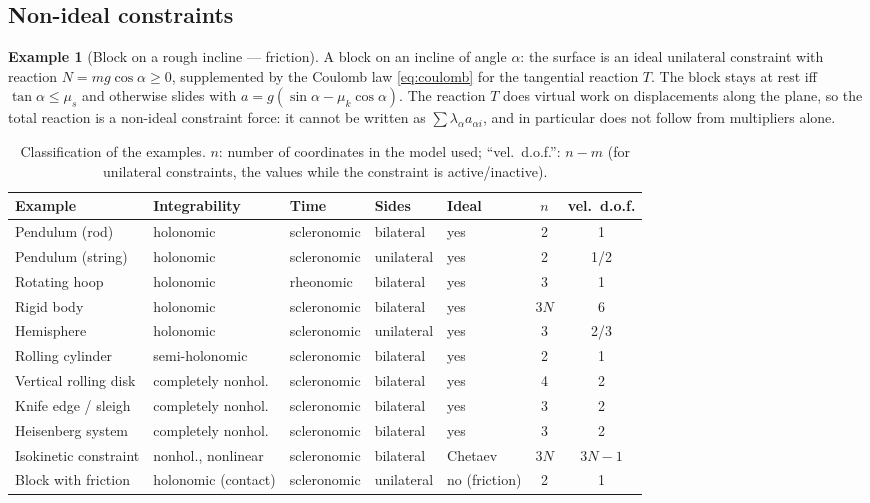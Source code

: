 \documentclass[11pt,a4paper]{article}
\theoremstyle{definition}
\newtheorem{example}{Example}[section]
\theoremstyle{plain}
\theoremstyle{remark}
\begin{document}
\subsection{Non-ideal constraints}

\begin{example}[Block on a rough incline --- friction]\label{ex:friction}
A block on an incline of angle $\alpha$: the surface is an ideal unilateral constraint with
reaction $N=mg\cos\alpha\ge0$, supplemented by the Coulomb law \eqref{eq:coulomb} for the tangential reaction
$T$. The block stays at rest iff $\tan\alpha\le\mu_s$ and otherwise slides with
$a=g(\sin\alpha-\mu_k\cos\alpha)$. The reaction $T$ does virtual work on displacements
along the plane, so the total reaction is a non-ideal constraint force: it cannot be written as
$\sum\lambda_\alpha a_{\alpha i}$, and in particular does not follow from multipliers alone.
\end{example}

\begin{table}[t]
\centering
\small
\renewcommand{\arraystretch}{1.2}
\begin{tabular}{@{}lllllcc@{}}
\toprule
\textbf{Example} & \textbf{Integrability} & \textbf{Time} & \textbf{Sides} & \textbf{Ideal} & $n$ & vel.\ d.o.f.\\
\midrule
Pendulum (rod)              & holonomic            & scleronomic & bilateral  & yes & 2 & 1\\
Pendulum (string)           & holonomic            & scleronomic & unilateral & yes & 2 & 1/2\\
Rotating hoop               & holonomic            & rheonomic   & bilateral  & yes & 3 & 1\\
Rigid body                  & holonomic            & scleronomic & bilateral  & yes & $3N$ & 6\\
Hemisphere                  & holonomic            & scleronomic & unilateral & yes & 3 & 2/3\\
Rolling cylinder            & semi-holonomic       & scleronomic & bilateral  & yes & 2 & 1\\
Vertical rolling disk       & completely nonhol.   & scleronomic & bilateral  & yes & 4 & 2\\
Knife edge / sleigh         & completely nonhol.   & scleronomic & bilateral  & yes & 3 & 2\\
Heisenberg system           & completely nonhol.   & scleronomic & bilateral  & yes & 3 & 2\\
Isokinetic constraint       & nonhol., nonlinear   & scleronomic & bilateral  & Chetaev & $3N$ & $3N-1$\\
Block with friction         & holonomic (contact)  & scleronomic & unilateral & no (friction) & 2 & 1\\
\bottomrule
\end{tabular}
\caption{Classification of the examples. $n$: number of coordinates in the model used;
``vel.\ d.o.f.'': $n-m$ (for unilateral constraints, the values while the constraint is
active/inactive).}\label{tab:examples}
\end{table}
\end{document}
